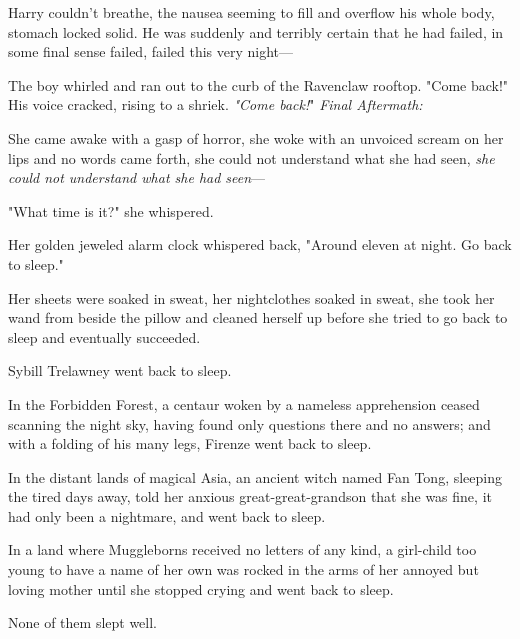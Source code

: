 Harry couldn't breathe, the nausea seeming to fill and overflow his whole body, 
stomach locked solid. He was suddenly and terribly certain that he had failed, 
in some final sense failed, failed this very night---

The boy whirled and ran out to the curb of the Ravenclaw rooftop. "Come back!" 
His voice cracked, rising to a shriek. \emph{"Come back!}"
\sbreak
\emph{Final Aftermath:}

She came awake with a gasp of horror, she woke with an unvoiced scream on her 
lips and no words came forth, she could not understand what she had seen, 
\emph{she could not understand what she had seen}---

"What time is it?" she whispered.

Her golden jeweled alarm clock whispered back, "Around eleven at night. Go back 
to sleep."

Her sheets were soaked in sweat, her nightclothes soaked in sweat, she took her 
wand from beside the pillow and cleaned herself up before she tried to go back 
to sleep and eventually succeeded.

Sybill Trelawney went back to sleep.

In the Forbidden Forest, a centaur woken by a nameless apprehension ceased 
scanning the night sky, having found only questions there and no answers; and 
with a folding of his many legs, Firenze went back to sleep.

In the distant lands of magical Asia, an ancient witch named Fan Tong, sleeping 
the tired days away, told her anxious great-great-grandson that she was fine, 
it had only been a nightmare, and went back to sleep.

In a land where Muggleborns received no letters of any kind, a girl-child too 
young to have a name of her own was rocked in the arms of her annoyed but 
loving mother until she stopped crying and went back to sleep.

None of them slept well.